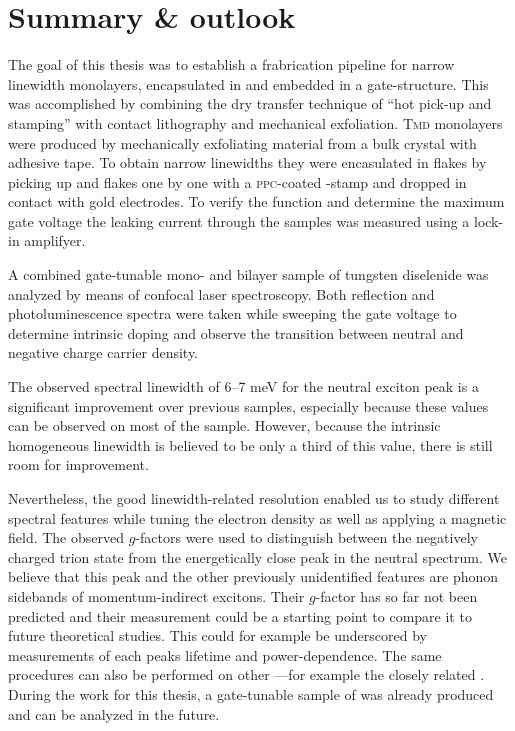 \chapter{Summary \& outlook}

The goal of this thesis was to establish a frabrication pipeline for narrow linewidth \tmdg monolayers, encapsulated in \hbng and embedded in a gate-structure. This was accomplished by combining the dry transfer technique of ``hot pick-up and stamping'' with contact lithography and mechanical exfoliation. \textsc{Tmd} monolayers were produced by mechanically exfoliating material from a bulk crystal with adhesive tape. To obtain narrow linewidths they were encasulated in \hbng flakes by picking up \hbng and \tmdg flakes one by one with a \textsc{ppc}-coated \pdms-stamp and dropped in contact with gold electrodes. To verify the function and determine the maximum gate voltage the leaking current through the samples was measured using a lock-in amplifyer.

A combined gate-tunable mono- and bilayer sample of tungsten diselenide was analyzed by means of confocal laser spectroscopy. Both reflection and photoluminescence spectra were taken while sweeping the gate voltage to determine intrinsic doping and observe the transition between neutral and negative charge carrier density.

The observed spectral linewidth of 6--7 meV for the neutral exciton peak is a significant improvement over previous samples, especially because these values can be observed on most of the sample. However, because the intrinsic homogeneous linewidth is believed to be only a third of this value, there is still room for improvement.

Nevertheless, the good linewidth-related resolution enabled us to study different spectral features while tuning the electron density as well as applying a magnetic field. The observed $g$-factors were used to distinguish between the negatively charged trion state from the energetically close peak in the neutral spectrum. We believe that this peak and the other previously unidentified features are phonon sidebands of momentum-indirect excitons. Their $g$-factor has so far not been predicted and their measurement could be a starting point to compare it to future theoretical studies. This could for example be underscored by measurements of each peaks lifetime and power-dependence. The same procedures can also be performed on other \tmds\!---for example the closely related \ws\!. During the work for this thesis, a gate-tunable sample of \ws was already produced and can be analyzed in the future.

